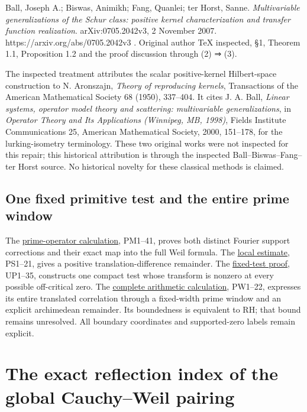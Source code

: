 \documentclass[
  10pt,
  a4paper,
]{article}
\begin{document}
Ball, Joseph A.; Biswas, Animikh; Fang, Quanlei; ter Horst, Sanne.
\emph{Multivariable generalizations of the Schur class: positive kernel
characterization and transfer function realization}. arXiv:0705.2042v3,
2 November 2007. https://arxiv.org/abs/0705.2042v3 . Original author TeX
inspected, §1, Theorem 1.1, Proposition 1.2 and the proof discussion
through (2) ⇒ (3).

The inspected treatment attributes the scalar positive-kernel
Hilbert-space construction to N. Aronszajn, \emph{Theory of reproducing
kernels}, Transactions of the American Mathematical Society 68 (1950),
337--404. It cites J. A. Ball, \emph{Linear systems, operator model
theory and scattering: multivariable generalizations}, in \emph{Operator
Theory and Its Applications (Winnipeg, MB, 1998)}, Fields Institute
Communications 25, American Mathematical Society, 2000, 151--178, for
the lurking-isometry terminology. These two original works were not
inspected for this repair; this historical attribution is through the
inspected Ball--Biswas--Fang--ter Horst source. No historical novelty
for these classical methods is claimed.

\subsection{One fixed primitive test and the entire prime
window}\label{one-fixed-primitive-test-and-the-entire-prime-window-2}

The \href{PRIME_PROJECTOR_MOBIUS_DERIVATION.md}{prime-operator
calculation}, PM1--41, proves both distinct Fourier support corrections
and their exact map into the full Weil formula. The
\href{PRIMITIVE_SHORT_SUPPORT_DERIVATION.md}{local estimate}, PS1--21,
gives a positive translation-difference remainder. The
\href{UNIVERSAL_PRIMITIVE_TRANSLATION_CRITERION.md}{fixed-test proof},
UP1--35, constructs one compact test whose transform is nonzero at every
possible off-critical zero. The
\href{PRIMITIVE_PRIME_WINDOW_DERIVATION.md}{complete arithmetic
calculation}, PW1--22, expresses its entire translated correlation
through a fixed-width prime window and an explicit archimedean
remainder. Its boundedness is equivalent to RH; that bound remains
unresolved. All boundary coordinates and supported-zero labels remain
explicit.

\clearpage

\section{The exact reflection index of the global Cauchy--Weil
pairing}\label{the-exact-reflection-index-of-the-global-cauchyweil-pairing}
\end{document}

